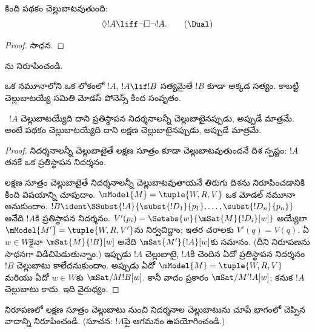 \documentclass[../../../include/open-logic-section]{subfiles}
\begin{document}
\begin{prop}
  కింది \Dual{} పథకం చెల్లుబాటవుతుంది:
  \begin{equation*}
  \Diamond !A \liff \lnot\Box\lnot !A. \tag{\Dual}
  \end{equation*}
\end{prop}

\begin{proof}
  సాధన.
\end{proof}

\begin{prob}
  ను నిరూపించండి.
\end{prob}

\begin{prop}
  ఒక నమూనాలోని ఒక లోకంలో $!A$,
  $!A \lif !B$ సత్యమైతే $!B$ కూడా
  అక్కడ సత్యం. కాబట్టి చెల్లుబాటయ్యే
   సమితి
  మోడస్ పోనెన్స్ కింద సంవృతం.
\end{prop}

\begin{prop}
  ~$!A$
  చెల్లుబాటయ్యేది దాని ప్రతిస్థాపన నిదర్శనాలన్నీ
  చెల్లుబాటైనప్పుడు, అప్పుడే మాత్రమే. అంటే పథకం చెల్లుబాటయ్యేది
  దాని లక్షణ  చెల్లుబాటైనప్పుడు, అప్పుడే మాత్రమే.
\end{prop}

\begin{proof}
  నిదర్శనాలన్నీ చెల్లుబాటైతే లక్షణ సూత్రం కూడా చెల్లుబాటవుతుందనే
  దిశ స్పష్టం: $!A$
  తనకే ఒక ప్రతిస్థాపన నిదర్శనం.

  లక్షణ సూత్రం చెల్లుబాటైతే నిదర్శనాలన్నీ చెల్లుబాటవుతాయనే
  తిరుగు దిశను నిరూపించడానికి కింది విషయాన్ని చూపుదాం.
  $\mModel{M} = \tuple{W, R, V}$
  ఒక మోడల్ నమూనా అనుకుందాం. $!B \ident
  \SSubst{!A}{\subst{!D_1}{p_1},\dots,\subst{!D_n}{p_n}}$
  అనేది $!A$కి ప్రతిస్థాపన నిదర్శనం.
  $V'(p_i) = \Setabs{w}{\mSat{M}{!D_i}[w]}$
  అయ్యేలా $\mModel{M'} = \tuple{W, R,
    V'}$ను నిర్వచిద్దాం; ఇతర చరాలకు
  $V'(q)=V(q)$.
  ఏ $w \in W$కైనా $\mSat{M}{!B}[w]$
  అనేది $\mSat{M'}{!A}[w]$కు సమానం.
  (దీని నిరూపణను సాధనగా విడిచిపెడుతున్నాం.)
  ఇప్పుడు $!A$ చెల్లుబాటై,
  $!A$కి చెందిన ఏదో ప్రతిస్థాపన నిదర్శనం
  $!B$ చెల్లుబాటు కాలేదనుకుందాం.
  అప్పుడు ఏదో $\mModel{M} = \tuple{W, R, V}$
  మరియు ఏదో $w \in W$కు
  $\mSat/{M}{!B}[w]$. కానీ వాదం ప్రకారం
  $\mSat/{M'}{!A}[w]$; కనుక $!A$
  చెల్లుబాటు కాదు. ఇది వైరుధ్యం.
\end{proof}

\begin{prob}
  నిరూపణలో లక్షణ సూత్రం చెల్లుబాటు నుంచి నిదర్శనాల చెల్లుబాటును చూపే భాగంలో
  చెప్పిన వాదాన్ని నిరూపించండి.
  (సూచన: $!A$పై ఆగమనం ఉపయోగించండి.)
\end{prob}
\end{document}
